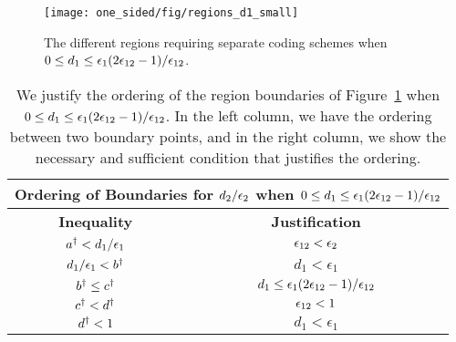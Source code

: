 
\begin{figure}
	\centering
	\texttt{[image: one\_sided/fig/regions\_d1\_small]}
	\caption{The different regions requiring separate coding schemes when $0 \leq d_1 \leq \epsilon_1 (2\epsilon_{12} - 1)/\epsilon_{12}$.}
	\label{fig:regions_d1_small}
\end{figure}

\begin{table}
	\begin{center}
		\begin{tabular}{| c | c |}
			\hline
			\multicolumn{2}{|c|}{{\bf Ordering of Boundaries for $d_2/\epsilon_2$ when $0 \leq d_1 \leq \epsilon_1 (2\epsilon_{12} - 1)/\epsilon_{12}$}} \\
			\hline
			{\bf Inequality} & {\bf Justification}   \\ \hline
			$a^{\dagger} < d_1/\epsilon_1$ & $\epsilon_{12} < \epsilon_2$ \\ \hline 
			$d_1/\epsilon_1 < b^{\dagger} $ & $d_1 < \epsilon_1$ \\ \hline 
			$b^{\dagger} \leq c^{\dagger}$ & $d_1 \leq \epsilon_1 (2\epsilon_{12} - 1)/\epsilon_{12}$ \\ \hline 
			$c^{\dagger} < d^{\dagger}$ & $\epsilon_{12} < 1$ \\ \hline 
			$d^{\dagger} < 1$ & $d_1 < \epsilon_1$ \\
			\hline
		\end{tabular}
	\end{center}
	\caption{We justify the ordering of the region boundaries of Figure~\ref{fig:regions_d1_small} when $0 \leq d_1 \leq \epsilon_1 (2\epsilon_{12} - 1)/\epsilon_{12}$.  In the left column, we have the ordering between two boundary points, and in the right column, we show the necessary and sufficient condition that justifies the ordering.}	
	\label{tab:d1_small}
\end{table}